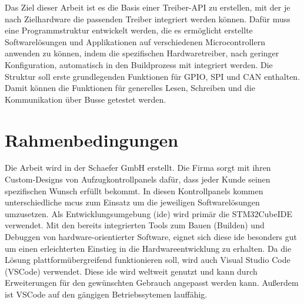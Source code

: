 Das Ziel dieser Arbeit ist es die Basis einer Treiber-API zu erstellen, mit der je nach Zielhardware die passenden Treiber integriert werden können.
Dafür muss eine Programmstruktur entwickelt werden, die es ermöglicht erstellte Softwarelösungen und Applikationen auf verschiedenen Microcontrollern anwenden zu können, indem die spezifischen Hardwaretreiber, nach geringer Konfiguration, automatisch in den Buildprozess mit integriert werden.
Die Struktur soll erste grundlegenden Funktionen für GPIO, SPI und CAN enthalten. 
Damit können die Funktionen für generelles Lesen, Schreiben und die Kommunikation über Busse getestet werden.


\section{Rahmenbedingungen} \label{chap2_rahmenbedingungen}
Die Arbeit wird in der Schaefer GmbH erstellt. 
Die Firma sorgt mit ihren Custom-Designs von Aufzugkontrollpanels dafür, dass jeder Kunde seinen spezifischen Wunsch erfüllt bekommt.
In diesen Kontrollpanels kommen unterschiedliche \gls{mcu}s zum Einsatz um die jeweiligen Softwarelösungen umzusetzen.
Als Entwicklungsumgebung (\gls{ide}) wird primär die STM32CubeIDE verwendet.
Mit den bereits integrierten Tools zum Bauen (Builden) und Debuggen von hardware-orientierter Software, eignet sich diese \gls{ide} besonders gut um einen erleichterten Einstieg in die Hardwareentwicklung zu erhalten.
Da die Lösung plattformübergreifend funktionieren soll, wird auch Visual Studio Code (VSCode) verwendet.
Diese \gls{ide} wird weltweit genutzt und kann durch Erweiterungen für den gewünschten Gebrauch angepasst werden kann. 
Außerdem ist VSCode auf den gängigen Betriebssytemen lauffähig.

